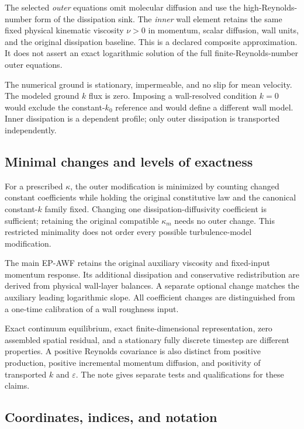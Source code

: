 \documentclass[11pt,a4paper]{article}
\numberwithin{equation}{section}
\newcommand{\eps}{\varepsilon}
\begin{document}
The selected \emph{outer} equations omit molecular diffusion and use the
high-Reynolds-number form of the dissipation sink. The \emph{inner}
wall element retains the same fixed physical kinematic viscosity
$\nu>0$ in momentum, scalar diffusion, wall units, and the original
dissipation baseline. This is a declared composite approximation.
It does not assert an exact logarithmic solution of the full
finite-Reynolds-number outer equations.

The numerical ground is stationary, impermeable, and no slip for mean
velocity. The modeled ground $k$ flux is zero. Imposing a wall-resolved
condition $k=0$ would exclude the constant-$k_0$ reference and would
define a different wall model. Inner dissipation is a dependent
profile; only outer dissipation is transported independently.

\subsection{Minimal changes and levels of exactness}

For a prescribed $\kappa$, the outer modification is minimized by
counting changed constant coefficients while holding the original
constitutive law and the canonical constant-$k$ family fixed. Changing
one dissipation-diffusivity coefficient is sufficient; retaining the
original compatible $\kappa_m$ needs no outer change. This restricted
minimality does not order every possible turbulence-model modification.

The main EP-AWF retains the original auxiliary viscosity and fixed-input
momentum response. Its additional dissipation and conservative
redistribution are derived from physical wall-layer balances.
A separate optional change matches the auxiliary leading logarithmic
slope. All coefficient changes are distinguished from a one-time
calibration of a wall roughness input.

Exact continuum equilibrium, exact finite-dimensional representation,
zero assembled spatial residual, and a stationary fully discrete
timestep are different properties. A positive Reynolds covariance is
also distinct from positive production, positive incremental momentum
diffusion, and positivity of transported $k$ and $\eps$.
The note gives separate tests and qualifications for these claims.

\subsection{Coordinates, indices, and notation}
\end{document}
